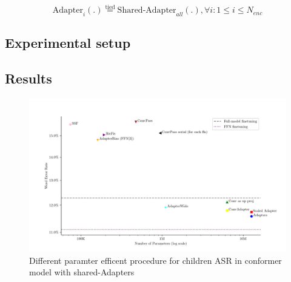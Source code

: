 \begin{equation}
    \text{Adapter}_{i}(.) \stackrel{\text{tied}}{=} \text{Shared-Adapter}_{all}(.) , \forall i: 1 \leq i \leq N_{enc}
\end{equation}

\subsection{Experimental setup}

\subsection{Results}

\begin{figure}
    \begin{center}
        \includegraphics[width=\textwidth]{imgs/Adapters_compare.png}
        \caption{Different paramter efficent procedure for children ASR in conformer model with shared-Adapters}
        \label{fig:adapter_compared}
    \end{center}
\end{figure}

